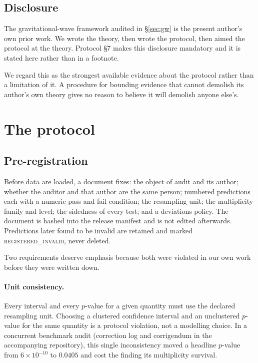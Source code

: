 \documentclass[11pt,a4paper]{article}
\newcommand{\verdict}[1]{\textsc{#1}}
\begin{document}
\subsection{Disclosure}
\label{sec:disclosure}

The gravitational-wave framework audited in \S\ref{sec:gw} is the present
author's own prior work. We wrote the theory, then wrote the protocol, then
aimed the protocol at the theory. Protocol \S7 makes this disclosure mandatory
and it is stated here rather than in a footnote.

We regard this as the strongest available evidence about the protocol rather
than a limitation of it. A procedure for bounding evidence that cannot demolish
its author's own theory gives no reason to believe it will demolish anyone
else's.

\section{The protocol}
\label{sec:protocol}

\subsection{Pre-registration}

Before data are loaded, a document fixes: the object of audit and its author;
whether the auditor and that author are the same person; numbered predictions
each with a numeric pass and fail condition; the resampling unit; the
multiplicity family and level; the sidedness of every test; and a deviations
policy. The document is hashed into the release manifest and is not edited
afterwards. Predictions later found to be invalid are retained and marked
\verdict{registered\_invalid}, never deleted.

Two requirements deserve emphasis because both were violated in our own work
before they were written down.

\paragraph{Unit consistency.} Every interval and every $p$-value for a given
quantity must use the declared resampling unit. Choosing a clustered confidence 
interval and an unclustered $p$-value for the same quantity is a protocol violation, 
not a modelling choice. In a concurrent benchmark audit (correction log and
corrigendum in the accompanying repository), this single inconsistency moved a headline $p$-value from $6\times10^{-10}$ to $0.0405$ and
cost the finding its multiplicity survival.
\end{document}
